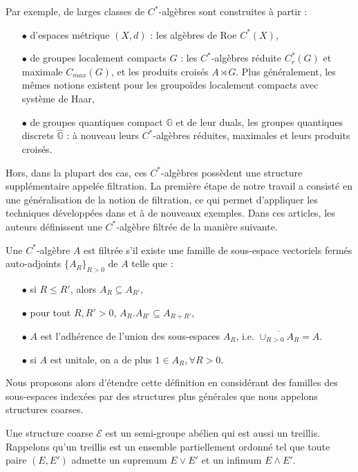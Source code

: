 Par exemple, de larges classes de $C^*$-algèbres sont construites à partir :\\ 
\begin{itemize}
\item[$\bullet$] d'espaces métrique $(X,d)$ : les algèbres de Roe $C^*(X)$,
\item[$\bullet$] de groupes localement compacts $G$ : les $C^*$-algèbres réduite $C^*_r(G)$ et maximale $C_{max}(G)$, et les produits croisés $A\rtimes G$. Plus généralement, les mêmes notions existent pour les groupoïdes localement compacts avec système de Haar,
\item[$\bullet$] de groupes quantiques compact $\mathbb G$ et de leur duals, les groupes quantiques discrets $\hat{\mathbb G}$ : à nouveau leurs $C^*$-algèbres réduites, maximales et leurs produits croisés.\\
\end{itemize}

Hors, dans la plupart des cas, ces $C^*$-algèbres possèdent une structure supplémentaire appelée filtration. La première étape de notre travail a consisté en une généralisation de la notion de filtration, ce qui permet d'appliquer les techniques développées dans \cite{OY2} et \cite{OY3} à de nouveaux exemples. Dans ces articles, les auteurs définissent une $C^*$-algèbre filtrée de la manière suivante.

\begin{definition}
Une $C^*$-algèbre $A$ est filtrée s'il existe une famille de sous-espace vectoriels fermés auto-adjoints $\{A_R\}_{R>0}$ de $A$ telle que :
\begin{itemize}
\item[$\bullet$] si $R\leq R'$, alors $A_R\subseteq A_{R'}$,
\item[$\bullet$] pour tout $R,R'>0$, $A_R.A_{R'}\subseteq A_{R+R'}$,
\item[$\bullet$] $A$ est l'adhérence de l'union des sous-espaces $A_R$, i.e. $\overline{\cup_{R>0}A_R} = A$.
\item[$\bullet$] si $A$ est unitale, on a de plus $1\in A_R,\forall R>0$.
\end{itemize}
\end{definition}

Nous proposons alors d'étendre cette définition en considérant des familles des sous-espaces indexées par des structures plus générales que nous appelons structures coarses. 

\begin{definition}
Une structure coarse $\mathcal E$ est un semi-groupe abélien qui est aussi un treillis. %
Rappelons qu'un treillis est un ensemble partiellement ordonné tel que toute paire $(E,E')$ admette un supremum $E\vee E'$ et un infimum $E\wedge E'$.
\end{definition}

